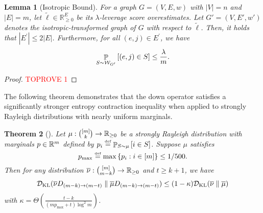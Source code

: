 \documentclass[11pt]{article}
\newtheorem{theorem}{Theorem} \newtheorem{lemma}[theorem]{Lemma} \newtheorem{proposition}[theorem]{Proposition} \newtheorem{corollary}[theorem]{Corollary} \newtheorem{definition}[theorem]{Definition} \newtheorem{conjecture}[theorem]{Conjecture} \newtheorem{claim}[theorem]{Claim} \newtheorem{fact}[theorem]{Fact}
\newcommand{\abss}[1]{\left\lvert #1 \right\rvert}
\newcommand{\paren}[1]{\left( #1 \right)}
\newcommand{\parens}[1]{( #1 )}
\newcommand{\sqb}[1]{\left[ #1 \right]}
\newcommand{\set}[1]{\left\{ #1 \right\}}
\newcommand{\defeq}{\stackrel{\smash{\text{\tiny\rm def}}}{=}}
\begin{document}
{\begin{lemma}[Isotropic Bound]\label{le:isotropic-transform-on-graph}
For a graph $G = (V, E, w)$
with $\abss{V} = n$ and $\abss{E} = m$,
let $\widetilde{\ell}\in \mathbb{R}^E_{\geq 0}$ be 
its $\lambda$-leverage score overestimates.
Let $G' = (V, E', w')$ denotes
the isotropic-transformed graph of $G$
with respect to $\widetilde{\ell}$.
Then,
it holds that
$\abss{E^\prime}\leq 2 \abss{E}$.
Furthermore,
for all $(e, j) \in E ^\prime$, 
we have
\[
\pb_{S \sim \cW_{G ^\prime}}\sqb{\parens{e,j}\in S} \leq\frac{\lambda}{m}.
\]
\end{lemma}
\begin{proof}\textcolor{red}{TOPROVE 1}\end{proof}

The following theorem demonstrates that the down operator satisfies a significantly stronger entropy contraction inequality when applied to strongly Rayleigh distributions with nearly uniform marginals.

\begin{theorem}[{\cite[Theorem 28]{ALV22}}]\label{thm:isotropy-entropy-contraction}
	Let $\mu: \binom{\sqb{m}}{k}\to \RR_{\geq 0}$ be a strongly Rayleigh distribution with marginals $p\in \mathbb{R}^{m}$ defined by $p_i\defeq\pb_{S \sim \mu}\sqb{ i \in S}$.
Suppose $\mu$ satisfies
\begin{equation*}
  p_{\max} \defeq \max\set{ p_i: i \in \sqb{m}} \leq  1/500.
\end{equation*}
Then for any distribution $\bar \nu:\binom{\sqb{m}}{m-k}\to \RR_{\geq 0}$ and $t \geq k +1$, we have
\begin{equation*}
	\cD_{\KL}\parens{\bar \nu D _{\parens{m-k}\to \parens{m-t}}\parallel \bar \mu D_{\parens{m-k}\to \parens{m-t}}}\leq \parens{1-\kappa} \cD_{\KL}\parens{\bar \nu\parallel \bar \mu}
\end{equation*}
with $\kappa=\Theta\paren{\frac{ t- k }{\parens{m p_{\max}+t}\log^2 m}}$. 
\end{theorem}



}
\end{document}
